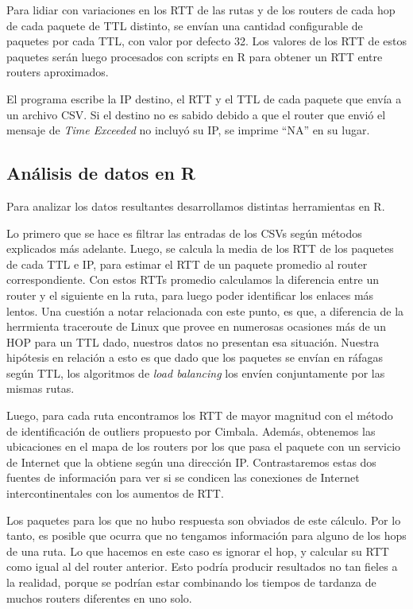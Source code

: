 Para lidiar con variaciones en los RTT de las rutas y de los routers de cada hop
de cada paquete de TTL distinto,
se envían una cantidad configurable de paquetes por cada TTL, con valor por
defecto 32. Los valores de los RTT de estos paquetes serán luego procesados con
scripts en R para obtener un RTT entre routers aproximados.

El programa escribe la IP destino, el RTT y el TTL de cada paquete que envía
a un archivo CSV. Si el destino no es sabido debido a que el router que envió
el mensaje de \emph{Time Exceeded} no incluyó su IP, se imprime ``NA'' en su 
lugar. 

\subsection{Análisis de datos en R}
Para analizar los datos resultantes desarrollamos distintas herramientas en R.

Lo primero que se hace es filtrar las entradas de los CSVs según métodos 
explicados más adelante.
Luego, se calcula la media de los RTT de los
paquetes de cada TTL e IP, para estimar el RTT de un paquete promedio al router
correspondiente. Con estos RTTs promedio calculamos la diferencia entre un 
router y el siguiente en la ruta, para luego poder identificar los enlaces
más lentos. Una cuestión a notar relacionada con este punto, es que, a diferencia
de la herrmienta traceroute de Linux que provee en numerosas ocasiones más de un
HOP para un TTL dado, nuestros datos no presentan esa situación. Nuestra
hipótesis en relación a esto es que dado que los paquetes se envían en ráfagas
según TTL, los algoritmos de \emph{load balancing} los envíen conjuntamente por
las mismas rutas.

Luego, para cada ruta encontramos los RTT de mayor magnitud con
el método de identificación de outliers propuesto por Cimbala. Además,
obtenemos las ubicaciones en el mapa de los routers por los que pasa 
el paquete con un servicio de Internet que la obtiene según una dirección IP.
Contrastaremos estas dos fuentes de información para ver si se condicen las
conexiones de Internet intercontinentales con los aumentos de RTT. 

Los paquetes para los que no hubo respuesta son obviados de este cálculo. 
Por lo tanto, es posible que ocurra que no tengamos información para alguno de 
los hops de una ruta. Lo que hacemos en este caso es ignorar el hop,
y calcular su RTT como igual al del router anterior. Esto podría
producir resultados no tan fieles a la realidad, porque se podrían estar
combinando los tiempos de tardanza de muchos routers diferentes en uno solo.

